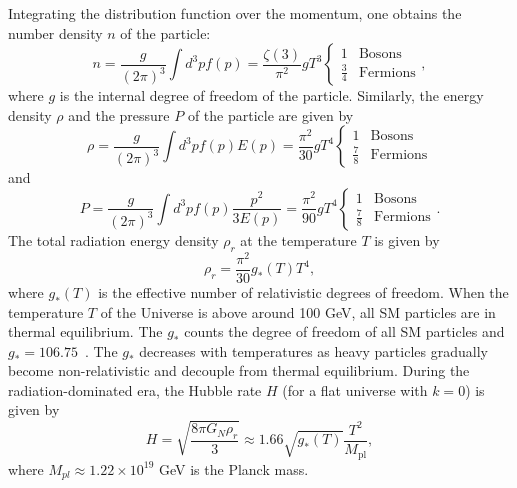 \documentclass[doublespace,nopageskip]{VTthesis}
\begin{document}
Integrating the distribution function over the momentum, one obtains the number density $n$ of the particle:
\begin{equation}
    n = \frac{g}{(2\pi)^3}\int d^3p f(p)=\frac{\zeta(3)}{\pi^2}gT^3\left\{
                \begin{array}{ll}
                  1 & \mathrm{Bosons}\\
                  \frac{3}{4} & \mathrm{Fermions}
                \end{array}
              \right.,
\end{equation}
where $g$ is the internal degree of freedom of the particle. Similarly, the energy density $\rho$ and the pressure $P$ of the particle are given by
\begin{equation}
    \rho = \frac{g}{(2\pi)^3}\int d^3p f(p)E(p)=\frac{\pi^2}{30}gT^4\left\{
                \begin{array}{ll}
                  1 & \mathrm{Bosons}\\
                  \frac{7}{8} & \mathrm{Fermions}
                \end{array}
              \right.
\end{equation}
and
\begin{equation}
    P = \frac{g}{(2\pi)^3}\int d^3p f(p)\frac{p^2}{3E(p)}=\frac{\pi^2}{90}gT^4\left\{
                \begin{array}{ll}
                  1 & \mathrm{Bosons}\\
                  \frac{7}{8} & \mathrm{Fermions}
                \end{array}
              \right..
\end{equation}
The total radiation energy density $\rho_r$ at the temperature $T$ is given by
\begin{equation}
    \rho_r = \frac{\pi^2}{30}g_*(T)T^4,
\end{equation}
where $g_*(T)$ is the effective number of relativistic degrees of freedom. When the temperature $T$ of the Universe is above around 100 GeV, all SM particles are in thermal equilibrium. The $g_*$ counts the degree of freedom of all SM particles and $g_* = 106.75$~\cite{2016Galax...4...78H}. The $g_*$ decreases with temperatures as heavy particles gradually become non-relativistic and decouple from thermal equilibrium. During the radiation-dominated
era, the Hubble rate $H$ (for a flat universe with $k=0$) is given by
\begin{equation}
    H = \sqrt{\frac{8\pi G_N \rho_r}{3}} \approx 1.66\sqrt{g_*(T)}\frac{T^2}{M_\mathrm{pl}},
\end{equation}
where $M_{pl} \approx 1.22\times 10^{19}$ GeV is the Planck mass.
\end{document}
